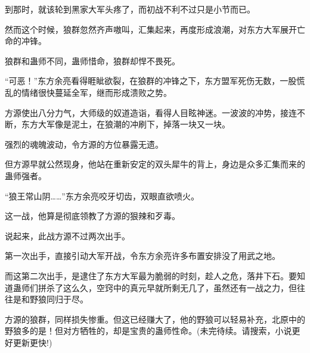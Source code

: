 \begin{this_body}
到那时，就该轮到黑家大军头疼了，而初战不利不过只是小节而已。

然而这个时候，狼群忽然齐声嗷叫，汇集起来，再度形成浪潮，对东方大军展开亡命的冲锋。

狼群和蛊师不同，蛊师惜命，狼群却悍不畏死。

“可恶！”东方余亮看得睚眦欲裂，在狼群的冲锋之下，东方盟军死伤无数，一股慌乱的情绪很快蔓延全军，继而形成溃败之势。

方源使出八分力气，大师级的奴道造诣，看得人目眩神迷。一波波的冲势，接连不断，东方大军像是泥土，在狼潮的冲刷下，掉落一块又一块。

强烈的魂魄波动，令方源的方位暴露无遗。

但方源早就公然现身，他站在重新安定的双头犀牛的背上，身边是众多汇集而来的蛊师强者。

“狼王常山阴……”东方余亮咬牙切齿，双眼直欲喷火。

这一战，他算是彻底领教了方源的狠辣和歹毒。

说起来，此战方源不过两次出手。

第一次出手，直接引动大军开战，令东方余亮许多布置安排没了用武之地。

而这第二次出手，是逮住了东方大军最为脆弱的时刻，趁人之危，落井下石。要知道蛊师们拼杀了这么久，空窍中的真元早就所剩无几了，虽然还有一战之力，但往往是和野狼同归于尽。

方源的狼群，同样损失惨重。但这已经赚大了，他的野狼可以轻易补充，北原中的野狼多的是！但对方牺牲的，却是宝贵的蛊师性命。(未完待续。请搜索，小说更好更新更快!)

\end{this_body}

